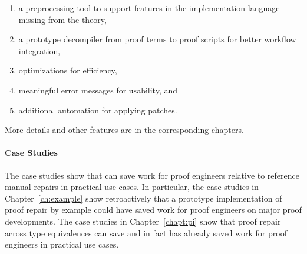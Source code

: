 \begin{enumerate}
\item a preprocessing tool to support features in the implementation language missing from the theory,
\item a prototype decompiler from proof terms to proof scripts for better workflow integration,
\item optimizations for efficiency,
\item meaningful error messages for usability, and
\item additional automation for applying patches. 
\end{enumerate}
More details and other features are in the corresponding chapters. %

\paragraph{Case Studies}
The case studies show that \sysnamelong can save work for proof engineers relative to 
reference manual repairs in practical use cases. %
In particular, the case studies in Chapter~\ref{ch:example} show retroactively that a prototype implementation of proof repair
by example could have saved work for proof engineers on major proof developments.
The case studies in Chapter~\ref{chapt:pi} show that proof repair across type equivalences can save
and in fact has already saved work for proof engineers in practical use cases.


